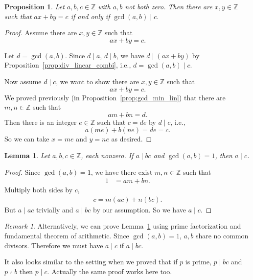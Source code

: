 \documentclass{amsbook}
\theoremstyle{plain}
\newtheorem{lemma}[theorem]{Lemma}
\newtheorem{proposition}[theorem]{Proposition}
\theoremstyle{definition}
\theoremstyle{remark}
\newtheorem{remark}[theorem]{Remark}
\numberwithin{equation}{chapter}
\numberwithin{figure}{chapter}
\newcommand{\Z}{\mathbb{Z}}
\begin{document}
\begin{proposition}\label{prop:diophantine_two_var}
  Let $a, b, c \in \mathbb{Z}$ with $a, b$ not both zero. Then there are $x, y \in \mathbb{Z}$ such that $ax + by = c$ if and only if  $\gcd(a, b) \mid c$.
\end{proposition}
\begin{proof}
Assume there are $x, y \in \mathbb{Z}$ such that 
\[
ax + by = c.
\]  

Let $d = \gcd (a, b)$. Since $d \mid a$, $d \mid b$, we have $d \mid (ax + by)$ by Proposition~\ref{prop:div_linear_combi}, i.e., $d = \gcd(a, b) \mid c$.

Now assume $d \mid c$, we want to show there are $x, y \in \mathbb{Z}$ such that 
\[
ax + by = c.
\]
We proved previously (in Proposition~\ref{prop:gcd_min_lin}) that there are $m, n \in \Z$ such that 
\[
am + bn = d.
\]
Then there is an integer $e \in \Z$ such that $c = de$ by $d \mid c$, i.e., 
\[
a(me) + b(ne) = de = c.
\]
So we can take $x = me$ and $y = ne$ as desired.
\end{proof}

\begin{lemma}\label{lem:lem1_day7}
Let $a, b, c \in \Z$, each nonzero. If $a \mid bc$ and $\gcd (a, b) = 1$, then $a \mid c$.
\end{lemma}
\begin{proof}
Since $\gcd (a, b) = 1$, we have there exist $m, n \in \Z$ such that
\begin{align}
1 &= am + bn.
\end{align}
Multiply both sides by $c$,
\begin{align}
c = m(ac) + n(bc).
\end{align}
But $a \mid ac$ trivially and $a \mid bc$ by our assumption. So we have $a \mid c$.
\end{proof}
\begin{remark}
Alternatively, we can prove Lemma~\ref{lem:lem1_day7} using prime factorization and fundamental theorem of arithmetic. Since $\gcd (a, b) = 1$, $a, b$ share no common divisors. Therefore we must have $a \mid c$ if $a \mid bc$.

It also looks similar to the setting when we proved that if $p$ is prime, $p \mid bc$ and $p \nmid b$ then $p \mid c$. Actually the same proof works here too. 
\end{remark}
\end{document}
